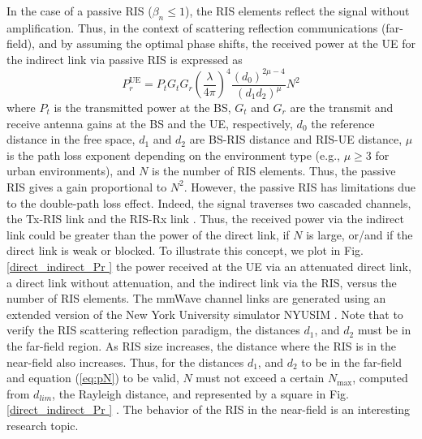 \documentclass[conference]{IEEEtran}
\begin{document}
In the case of a passive RIS ($\beta_n \leq 1$),  the RIS elements reflect the signal without amplification. Thus, in the context of scattering reflection  communications (far-field), and by assuming the optimal phase shifts, the received power at the UE for the indirect link via passive  RIS is expressed as \cite{alfattani2021link}%
\begin{equation}\label{eq:pN}
P_{r}^{\text{UE}}=P_tG_tG_r\left(\frac{\lambda}{4\pi}\right) ^4\frac{(d_0)^{2\mu-4}}{{(d_1d_2)^\mu}}N^2 
\end{equation}
where $P_t$ is the transmitted power at the BS, $G_t$ and $G_r$ are the transmit and receive antenna gains at the BS and the UE, respectively, $d_0$ the reference distance in the free space, $d_1$ and  $d_2$ are  BS-RIS distance and  RIS-UE distance, $\mu$ is the path loss exponent depending on the environment type (e.g., $\mu \ge 3$ for urban environments), and $N$ is the number of  RIS elements.  Thus, the passive RIS gives a gain proportional to $N^2$. However, the passive RIS has limitations due to the double-path loss effect. Indeed, the signal traverses two cascaded channels,  the Tx-RIS link and the RIS-Rx  link \cite{9998527}. Thus, the received power via the indirect link could be greater
than the power of the direct link, if $N$ is large, or/and if
the direct link is weak or blocked. To illustrate this concept, we plot in  Fig.  \ref{direct_indirect_Pr } the power received at the UE via an
attenuated direct link, a direct link without attenuation, and the indirect
link via the RIS, versus the number of RIS elements.  The mmWave channel links are generated using an extended version of the New York University simulator NYUSIM \cite{habib2023extended}.  Note that to verify the RIS scattering reflection paradigm, the distances $d_1$, and $d_2$ must be in the far-field region. As  RIS size increases, the distance where the RIS is in the near-field also increases. Thus, for the distances $d_1$, and $d_2$ to be in the far-field and equation (\ref{eq:pN}) to be valid,   $N$ must not exceed a certain $N_{\max}$, computed from $d_{lim}$, the Rayleigh distance, and represented by a square in Fig. \ref{direct_indirect_Pr } \cite{habib2023extended}.  The behavior of the RIS in the near-field  is an interesting research topic.
\end{document}
